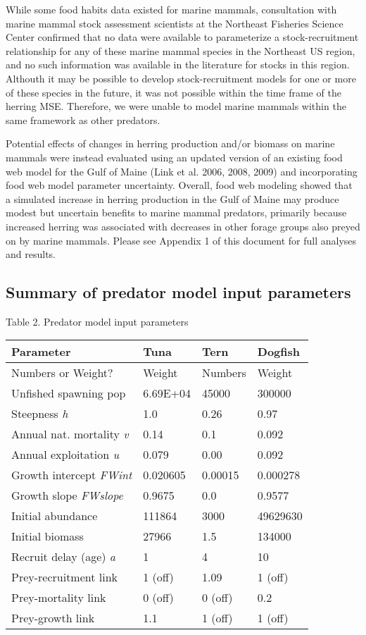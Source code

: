 \documentclass[]{article}
\begin{document}
While some food habits data existed for marine mammals, consultation
with marine mammal stock assessment scientists at the Northeast
Fisheries Science Center confirmed that no data were available to
parameterize a stock-recruitment relationship for any of these marine
mammal species in the Northeast US region, and no such information was
available in the literature for stocks in this region. Althouth it may
be possible to develop stock-recruitment models for one or more of these
species in the future, it was not possible within the time frame of the
herring MSE. Therefore, we were unable to model marine mammals within
the same framework as other predators.

Potential effects of changes in herring production and/or biomass on
marine mammals were instead evaluated using an updated version of an
existing food web model for the Gulf of Maine (Link et al. 2006, 2008,
2009) and incorporating food web model parameter uncertainty. Overall,
food web modeling showed that a simulated increase in herring production
in the Gulf of Maine may produce modest but uncertain benefits to marine
mammal predators, primarily because increased herring was associated
with decreases in other forage groups also preyed on by marine mammals.
Please see Appendix 1 of this document for full analyses and results.

\subsection{Summary of predator model input
parameters}\label{summary-of-predator-model-input-parameters}

Table 2. Predator model input parameters

\begin{longtable}[]{@{}llll@{}}
\toprule
Parameter & Tuna & Tern & Dogfish\tabularnewline
\midrule
\endhead
Numbers or Weight? & Weight & Numbers & Weight\tabularnewline
Unfished spawning pop & 6.69E+04 & 45000 & 300000\tabularnewline
Steepness \emph{h} & 1.0 & 0.26 & 0.97\tabularnewline
Annual nat. mortality \emph{v} & 0.14 & 0.1 & 0.092\tabularnewline
Annual exploitation \emph{u} & 0.079 & 0.00 & 0.092\tabularnewline
Growth intercept \emph{FWint} & 0.020605 & 0.00015 &
0.000278\tabularnewline
Growth slope \emph{FWslope } & 0.9675 & 0.0 & 0.9577\tabularnewline
Initial abundance & 111864 & 3000 & 49629630\tabularnewline
Initial biomass & 27966 & 1.5 & 134000\tabularnewline
Recruit delay (age) \emph{a} & 1 & 4 & 10\tabularnewline
Prey-recruitment link & 1 (off) & 1.09 & 1 (off)\tabularnewline
Prey-mortality link & 0 (off) & 0 (off) & 0.2\tabularnewline
Prey-growth link & 1.1 & 1 (off) & 1 (off)\tabularnewline
\bottomrule
\end{longtable}
\end{document}
